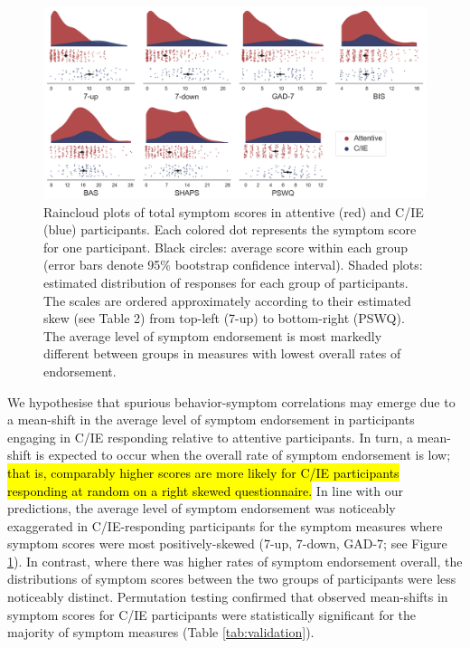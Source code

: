 \documentclass[a4paper,notitlepage,12pt]{article}
\begin{document}
\begin{refsection}[main]
\begin{figure}[t!]
\includegraphics[width=16cm]{../figures/main_02a.png}
\centering
\captionsetup{width=0.88\textwidth}
\caption{Raincloud plots of total symptom scores in attentive (red) and C/IE (blue) participants. Each colored dot represents the symptom score for one participant. Black circles: average score within each group (error bars denote 95\% bootstrap confidence interval). Shaded plots: estimated distribution of responses for each group of participants. The scales are ordered approximately according to their estimated skew (see Table 2) from top-left (7-up) to bottom-right (PSWQ). The average level of symptom endorsement is most markedly different between groups in measures with lowest overall rates of endorsement.}
\label{fig:distributions}
\end{figure}

We hypothesise that spurious behavior-symptom correlations may emerge due to a mean-shift in the average level of symptom endorsement in participants engaging in C/IE responding relative to attentive participants. In turn, a mean-shift is expected to occur when the overall rate of symptom endorsement is low; \hl{that is, comparably higher scores are more likely for C/IE participants responding at random on a right skewed questionnaire.} In line with our predictions, the average level of symptom endorsement was noticeably exaggerated in C/IE-responding participants for the symptom measures where symptom scores were most positively-skewed (7-up, 7-down, GAD-7; see Figure \ref{fig:distributions}). In contrast, where there was higher rates of symptom endorsement overall, the distributions of symptom scores between the two groups of participants were less noticeably distinct. Permutation testing confirmed that observed mean-shifts in symptom scores for C/IE participants were statistically significant for the majority of symptom measures (Table \ref{tab:validation}).


\end{refsection}
\end{document}
